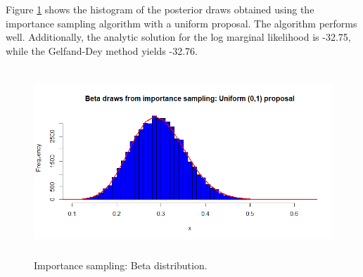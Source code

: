 \begin{enumerate}[leftmargin=*]
Figure \ref{fig55} shows the histogram of the posterior draws obtained using the importance sampling algorithm with a uniform proposal. The algorithm performs well. Additionally, the analytic solution for the log marginal likelihood is -32.75, while the Gelfand-Dey method yields -32.76.

\begin{figure}[!h]
	\includegraphics[width=340pt, height=200pt]{Chapters/chapter5/figures/ISbeta.png}
	\caption[List of figure caption goes here]{Importance sampling: Beta distribution.}\label{fig55}
\end{figure}  
  

\end{enumerate}